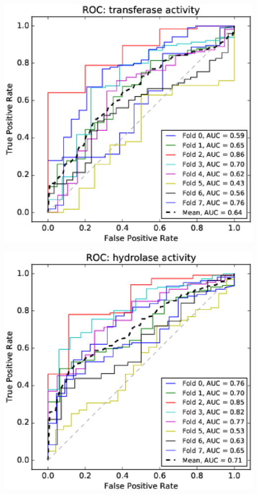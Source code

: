 \documentclass[11pt,twoside,a4paper]{book}
\newenvironment{Figure}
  {\par\medskip\noindent\minipage{\linewidth}}
  {\endminipage\par\medskip}
\begin{document}
\begin{multicols}{2}
\begin{Figure}\begin{center}\includegraphics[width=\linewidth]{figures/roc_transferase_activity}\label{fig:roc_transferase_activity}\end{center}\end{Figure}
\begin{Figure}\begin{center}\includegraphics[width=\linewidth]{figures/roc_hydrolase_activity}\label{fig:roc_hydrolase_activity}\end{center}\end{Figure}

\end{multicols}
\end{document}
